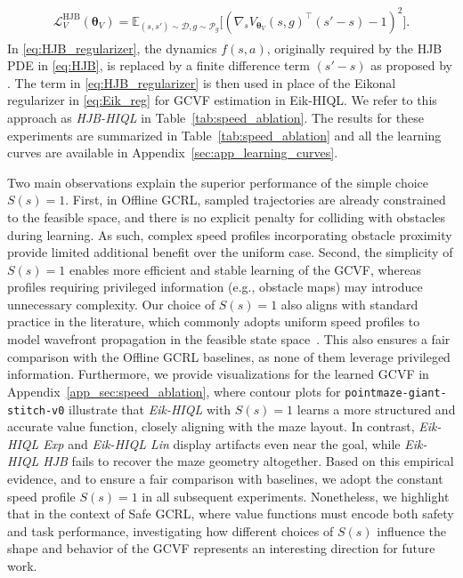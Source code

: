 \documentclass{article}
\theoremstyle{plain}
\theoremstyle{definition}
\theoremstyle{remark}
\begin{document}
\begin{align}
    \begin{split}
        \mathcal{L}^{\text{HJB}}_V(\bm{\theta}_V) = \mathbb{E}_{(s,s') \sim \mathcal{D}, g \sim \mathcal{P}_g}\Big[\left(\nabla_s V_{\bm{\theta}_V}(s, g)^{\intercal}(s'-s) - 1 \right)^2\Big].
    \end{split}\label{eq:HJB_regularizer}
\end{align}
In \eqref{eq:HJB_regularizer}, the dynamics $f(s,a)$, originally required by the HJB PDE in \eqref{eq:HJB}, is replaced by a finite difference term $(s'-s)$ as proposed by \citet{lienenhancing}. The term in \eqref{eq:HJB_regularizer} is then used in place of the Eikonal regularizer in \eqref{eq:Eik_reg} for GCVF estimation in Eik-HIQL. We refer to this approach as \textit{HJB-HIQL} in Table~\ref{tab:speed_ablation}. The results for these experiments are summarized in Table~\ref{tab:speed_ablation} and all the learning curves are available in Appendix~\ref{sec:app_learning_curves}.

Two main observations explain the superior performance of the simple choice $S(s) = 1$. First, in Offline GCRL, sampled trajectories are already constrained to the feasible space, and there is no explicit penalty for colliding with obstacles during learning. As such, complex speed profiles incorporating obstacle proximity provide limited additional benefit over the uniform case. Second, the simplicity of $S(s) = 1$ enables more efficient and stable learning of the GCVF, whereas profiles requiring privileged information (e.g., obstacle maps) may introduce unnecessary complexity. Our choice of $S(s) = 1$ also aligns with standard practice in the literature, which commonly adopts uniform speed profiles to model wavefront propagation in the feasible state space~\cite{sethian1996fast, nintfields}. This also ensures a fair comparison with the Offline GCRL baselines, as none of them leverage privileged information. Furthermore, we provide visualizations for the learned GCVF in Appendix~\ref{app_sec:speed_ablation}, where contour plots for \texttt{pointmaze-giant-stitch-v0} illustrate that \textit{Eik-HIQL} with $S(s)=1$ learns a more structured and accurate value function, closely aligning with the maze layout. In contrast, \textit{Eik-HIQL Exp} and \textit{Eik-HIQL Lin} display artifacts even near the goal, while \textit{Eik-HIQL HJB} fails to recover the maze geometry altogether. Based on this empirical evidence, and to ensure a fair comparison with baselines, we adopt the constant speed profile $S(s)=1$ in all subsequent experiments. Nonetheless, we highlight that in the context of Safe GCRL, where value functions must encode both safety and task performance, investigating how different choices of $S(s)$ influence the shape and behavior of the GCVF represents an interesting direction for future work.
\end{document}
